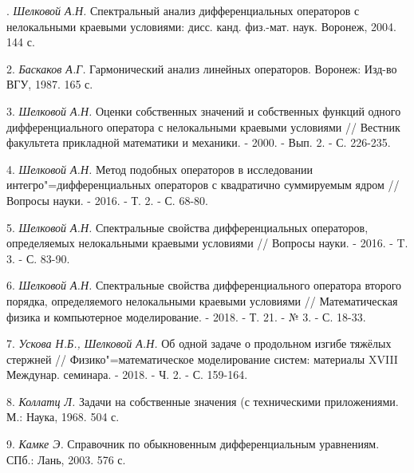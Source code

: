 . {\it Шелковой А.Н.} Спектральный анализ дифференциальных операторов с нелокальными краевыми условиями: дисс. канд. физ.-мат. наук. Воронеж, 2004. 144 с.

2. {\it Баскаков А.Г.} Гармонический анализ линейных операторов. Воронеж: Изд-во ВГУ, 1987. 165 с.

3. {\it Шелковой А.Н.} Оценки собственных значений и собственных функций одного дифференциального оператора с нелокальными краевыми условиями // Вестник факультета прикладной математики и механики. - 2000. - Вып. 2. - С. 226-235.

4. {\it Шелковой А.Н.} Метод подобных операторов в исследовании интегро"=дифференциальных операторов с квадратично суммируемым ядром // Вопросы науки. - 2016. - Т. 2. - С. 68-80.

5. {\it Шелковой А.Н.} Спектральные свойства дифференциальных операторов, определяемых нелокальными краевыми условиями // Вопросы науки. - 2016. - T. 3. - С. 83-90.

6. {\it Шелковой А.Н.} Спектральные свойства дифференциального оператора второго порядка, определяемого нелокальными краевыми условиями // Математическая физика и компьютерное моделирование. - 2018. - Т. 21. - № 3. - С. 18-33.

7. {\it Ускова Н.Б., Шелковой А.Н.} Об одной задаче о продольном изгибе тяжёлых стержней // Физико"=математическое моделирование систем: материалы XVIII Междунар. семинара. - 2018. - Ч. 2. - С. 159-164.

8. {\it Коллатц Л.} Задачи на собственные значения (с техническими приложениями. М.: Наука, 1968. 504 с.

9. {\it Камке Э.} Справочник по обыкновенным дифференциальным уравнениям. СПб.: Лань, 2003. 576 с.
